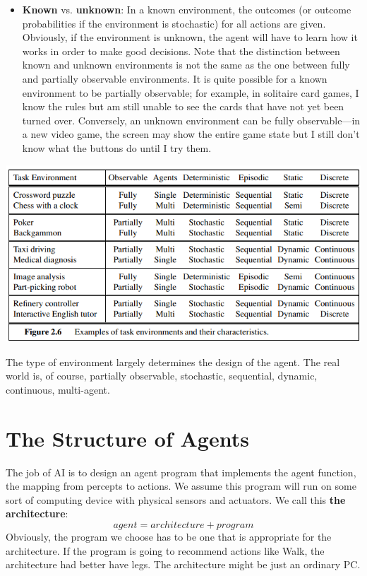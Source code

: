 \begin{itemize}
    \item \textbf{Known} vs. \textbf{unknown}:  In a known environment, the outcomes (or outcome probabilities if the environment is stochastic) for all actions are given. Obviously, if the environment is unknown, the agent will have to learn how it works in order to make good decisions. Note that the distinction between known and unknown environments is not the same as the one between fully and partially observable environments.  It is quite possible for a known environment to be partially observable; for example, in solitaire card games, I know the rules but am still unable to see the cards that have not yet been turned over. Conversely, an unknown environment can be fully observable—in a new video game, the screen may show the entire game state but I still don’t know what the buttons do until I try them.
\end{itemize}
\begin{center}
    \includegraphics[]{images/tasks environment.png}
\end{center}
The type of environment largely determines the design of the agent. The real world is, of course, partially observable, stochastic, sequential, dynamic, continuous, multi-agent.

\section{The Structure of Agents}
The job of AI is to design an agent program that implements the agent function, the mapping from percepts to actions. We assume this program will run on some sort of computing device with physical sensors and actuators. We call this \textbf{the architecture}:
\[agent = architecture + program\]
Obviously, the program we choose has to be one that is appropriate for the architecture. If the program is going to recommend actions like Walk, the architecture had better have legs. The architecture might be just an ordinary PC.

